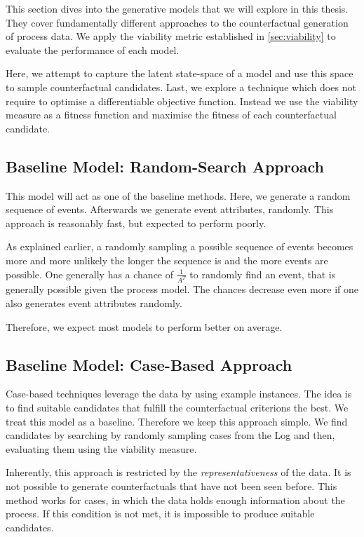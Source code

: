 \documentclass[./../../paper.tex]{subfiles}
\begin{document}
This section dives into the generative models that we will explore in this thesis. They cover fundamentally different approaches to the counterfactual generation of process data. We apply the viability metric established in \autoref{sec:viability} to evaluate the performance of each model.


Here, we attempt to capture the latent state-space of a model and use this space to sample counterfactual candidates.  Last, we explore a technique which does not require to optimise a differentiable objective function. Instead we use the viability measure as a fitness function and maximise the fitness of each counterfactual candidate.



\subsection{Baseline Model: Random-Search Approach}
This model will act as one of the baseline methods. Here, we generate a random sequence of events. Afterwards we generate event attributes, randomly. This approach is reasonably fast, but expected to perform poorly.

As explained earlier, a randomly sampling a possible sequence of events becomes more and more unlikely the longer the sequence is and the more events are possible. One generally has a chance of $\frac{1}{A^T}$ to randomly find an event, that is generally possible given the process model. The chances decrease even more if one also generates event attributes randomly.

Therefore, we expect most models to perform better on average.


\subsection{Baseline Model: Case-Based Approach}
Case-based techniques leverage the data by using example instances. The idea is to find suitable candidates that fulfill the counterfactual criterions the best. We treat this model as a baseline. Therefore we keep this approach simple. We find candidates by searching by randomly sampling cases from the Log and then, evaluating them using the viability measure.

Inherently, this approach is restricted by the \emph{representativeness} of the data. It is not possible to generate counterfactuals that have not been seen before. This method works for cases, in which the data holds enough information about the process. If this condition is not met, it is impossible to produce suitable candidates.
\end{document}
